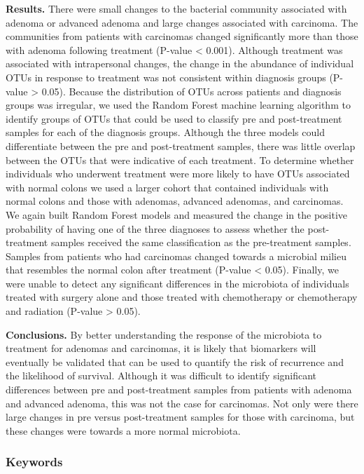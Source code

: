 \documentclass[12pt,]{article}
\begin{document}
\textbf{Results.} There were small changes to the bacterial community
associated with adenoma or advanced adenoma and large changes associated
with carcinoma. The communities from patients with carcinomas changed
significantly more than those with adenoma following treatment (P-value
\textless{} 0.001). Although treatment was associated with intrapersonal
changes, the change in the abundance of individual OTUs in response to
treatment was not consistent within diagnosis groups (P-value
\textgreater{} 0.05). Because the distribution of OTUs across patients
and diagnosis groups was irregular, we used the Random Forest machine
learning algorithm to identify groups of OTUs that could be used to
classify pre and post-treatment samples for each of the diagnosis
groups. Although the three models could differentiate between the pre
and post-treatment samples, there was little overlap between the OTUs
that were indicative of each treatment. To determine whether individuals
who underwent treatment were more likely to have OTUs associated with
normal colons we used a larger cohort that contained individuals with
normal colons and those with adenomas, advanced adenomas, and
carcinomas. We again built Random Forest models and measured the change
in the positive probability of having one of the three diagnoses to
assess whether the post-treatment samples received the same
classification as the pre-treatment samples. Samples from patients who
had carcinomas changed towards a microbial milieu that resembles the
normal colon after treatment (P-value \textless{} 0.05). Finally, we
were unable to detect any significant differences in the microbiota of
individuals treated with surgery alone and those treated with
chemotherapy or chemotherapy and radiation (P-value \textgreater{}
0.05).

\textbf{Conclusions.} By better understanding the response of the
microbiota to treatment for adenomas and carcinomas, it is likely that
biomarkers will eventually be validated that can be used to quantify the
risk of recurrence and the likelihood of survival. Although it was
difficult to identify significant differences between pre and
post-treatment samples from patients with adenoma and advanced adenoma,
this was not the case for carcinomas. Not only were there large changes
in pre versus post-treatment samples for those with carcinoma, but these
changes were towards a more normal microbiota.

\subsubsection{Keywords}\label{keywords}
\end{document}
